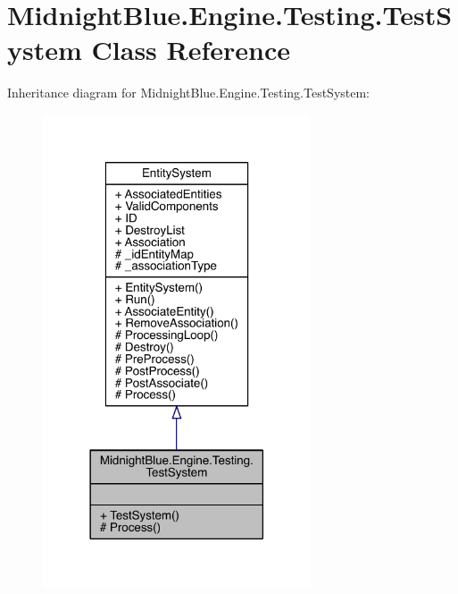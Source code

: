\hypertarget{class_midnight_blue_1_1_engine_1_1_testing_1_1_test_system}{}\section{Midnight\+Blue.\+Engine.\+Testing.\+Test\+System Class Reference}
\label{class_midnight_blue_1_1_engine_1_1_testing_1_1_test_system}


Inheritance diagram for Midnight\+Blue.\+Engine.\+Testing.\+Test\+System\+:
\nopagebreak
\begin{figure}[H]
\begin{center}
\leavevmode
\includegraphics[width=225pt]{class_midnight_blue_1_1_engine_1_1_testing_1_1_test_system__inherit__graph}
\end{center}
\end{figure}


